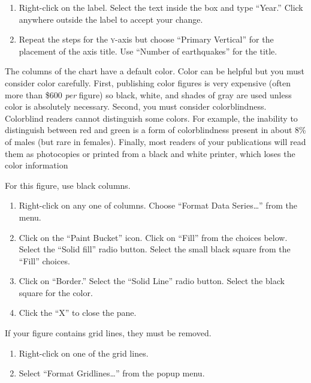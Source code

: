 \documentclass[12pt, hidelinks]{exam}
\newcommand*\axis[1]{{\scshape #1}-axis}
\begin{document}
\begin{questions}
\begin{enumerate}[resume]
	\item Right-click on the label. Select the text inside the box and type “Year.” Click anywhere outside the label to accept your change.

	\item Repeat the steps for the \axis{y} but choose “Primary Vertical” for the placement of the axis title. Use “Number of earthquakes” for the title. 

	
\end{enumerate}


The columns of the chart have a default color. Color can be helpful but you must consider color carefully. First, publishing color figures is very expensive (often more than \$600 \emph{per} figure) so black, white, and shades of gray are used unless color is absolutely necessary. Second, you must consider colorblindness. Colorblind readers cannot distinguish some colors. For example, the inability to distinguish between red and green is a form of colorblindness present in about 8\% of males (but rare in females). Finally, most readers
of your publications will read them as photocopies or printed from
a black and white printer, which loses the color information

For this figure, use black columns.

\begin{enumerate}[resume]
	\item Right-click on any one of columns. Choose “Format Data Series\dots” from the menu.
	
	\item Click on the “Paint Bucket” icon. Click on “Fill” from the choices below. Select the “Solid fill” radio button. Select the small black square from the “Fill” choices.
	
	\item Click on “Border.” Select the “Solid Line” radio button. Select the black square for the color.
	
	\item Click the “X” to close the pane.
	
\end{enumerate}

If your figure contains grid lines, they must be removed.


\begin{enumerate}[resume]
	\item Right-click on one of the grid lines. 
	
	\item Select “Format Gridlines\dots” from the popup menu. 
	

\end{enumerate}
\end{questions}
\end{document}
